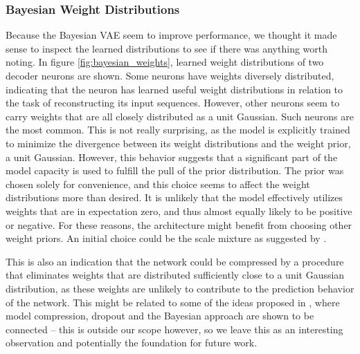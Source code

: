 \subsubsection{Bayesian Weight Distributions}
Because the Bayesian VAE seem to improve performance, we thought it made sense to inspect the learned distributions to see if there was anything worth noting. In figure \ref{fig:bayesian_weights}, learned weight distributions of two decoder neurons are shown. Some neurons have weights diversely distributed, indicating that the neuron has learned useful weight distributions in relation to the task of reconstructing its input sequences. However, other neurons seem to carry weights that are all closely distributed as a unit Gaussian. Such neurons are the most common. This is not really surprising, as the model is explicitly trained to minimize the divergence between its weight distributions and the weight prior, a unit Gaussian. However, this behavior suggests that a significant part of the model capacity is used to fulfill the pull of the prior distribution. The prior was chosen solely for convenience, and this choice seems to affect the weight distributions more than desired. It is unlikely that the model effectively utilizes weights that are in expectation zero, and thus almost equally likely to be positive or negative. For these reasons, the architecture might benefit from choosing other weight priors. An initial choice could be the scale mixture as suggested by \textcite{blundell2015weight}.

This is also an indication that the network could be compressed by a procedure that eliminates weights that are distributed sufficiently close to a unit Gaussian distribution, as these weights are unlikely to contribute to the prediction behavior of the network. This might be related to some of the ideas proposed in \textcite{molchanov2017variational, kingma2015variational, gal2016dropout}, where model compression, dropout and the Bayesian approach are shown to be connected -- this is outside our scope however, so we leave this as an interesting observation and potentially the foundation for future work.


